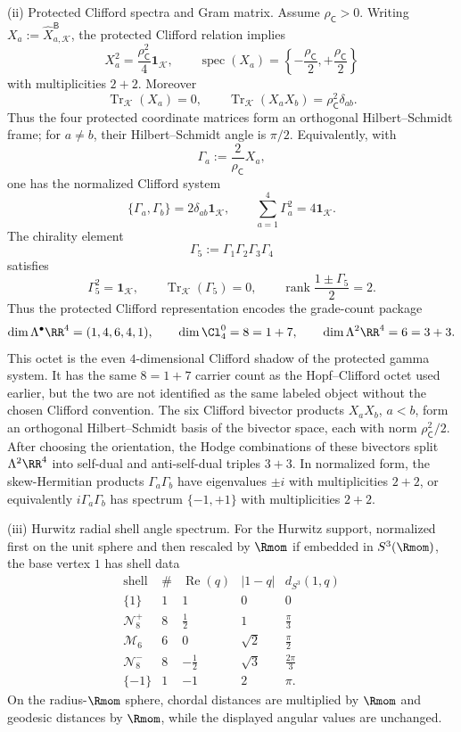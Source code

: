 \documentclass[11pt]{article}
\begin{document}
\begin{theorem}[\(m=1\) finite numerical data]
\smallskip
\noindent\textup{(ii) Protected Clifford spectra and Gram matrix.}
Assume \(\rho_{\mathsf C}>0\).  Writing
\(X_a:=\widehat X^{\mathsf B}_{a,\mathcal K}\), the protected Clifford relation
implies
\[
    X_a^2=\frac{\rho_{\mathsf C}^2}{4}\mathbf1_{\mathcal K},
    \qquad
    \operatorname{spec}(X_a)=
    \left\{-\frac{\rho_{\mathsf C}}{2},+\frac{\rho_{\mathsf C}}{2}\right\}
\]
with multiplicities \(2+2\).  Moreover
\[
    \operatorname{Tr}_{\mathcal K}(X_a)=0,
    \qquad
    \operatorname{Tr}_{\mathcal K}(X_aX_b)=\rho_{\mathsf C}^2\delta_{ab}.
\]
Thus the four protected coordinate matrices form an orthogonal Hilbert--Schmidt
frame; for \(a\ne b\), their Hilbert--Schmidt angle is \(\pi/2\).  Equivalently,
with
\[
    \Gamma_a:=\frac{2}{\rho_{\mathsf C}}X_a,
\]
one has the normalized Clifford system
\[
    \{\Gamma_a,\Gamma_b\}=2\delta_{ab}\mathbf1_{\mathcal K},
    \qquad
    \sum_{a=1}^4\Gamma_a^2=4\mathbf1_{\mathcal K}.
\]
The chirality element
\[
    \Gamma_5:=\Gamma_1\Gamma_2\Gamma_3\Gamma_4
\]
satisfies
\[
    \Gamma_5^2=\mathbf1_{\mathcal K},
    \qquad
    \operatorname{Tr}_{\mathcal K}(\Gamma_5)=0,
    \qquad
    \operatorname{rank}\frac{1\pm\Gamma_5}{2}=2.
\]
Thus the protected Clifford representation encodes the grade-count package
\[
    \dim\Lambda^\bullet\RR^4=(1,4,6,4,1),
    \qquad
    \dim\Cl^0_4=8=1+7,
    \qquad
    \dim\Lambda^2\RR^4=6=3+3.
\]
This octet is the even \(4\)-dimensional Clifford shadow of the protected gamma system.  It has the same \(8=1+7\) carrier count as the Hopf--Clifford octet used earlier, but the two are not identified as the same labeled object without the chosen Clifford convention.
The six Clifford bivector products \(X_aX_b\), \(a<b\), form an orthogonal Hilbert--Schmidt basis of the bivector space, each with norm \(\rho_{\mathsf C}^2/2\). After choosing the orientation, the Hodge combinations of these bivectors split \(\Lambda^2\RR^4\) into self-dual and anti-self-dual triples \(3+3\).  In normalized
form, the skew-Hermitian products \(\Gamma_a\Gamma_b\) have eigenvalues
\(\pm i\) with multiplicities \(2+2\), or equivalently
\(i\Gamma_a\Gamma_b\) has spectrum \(\{ -1,+1\}\) with multiplicities \(2+2\).

\smallskip
\noindent\textup{(iii) Hurwitz radial shell angle spectrum.}
For the Hurwitz support, normalized first on the unit sphere and then rescaled by
\(\Rmom\) if embedded in \(S^3(\Rmom)\), the base vertex \(1\) has shell data
\[
\begin{array}{c|c|c|c|c}
\text{shell} & \# & \operatorname{Re}(q) & |1-q| & d_{S^3}(1,q)\\
\hline
\{1\} & 1 & 1 & 0 & 0\\
\mathcal N_8^+ & 8 & \tfrac12 & 1 & \tfrac\pi3\\
\mathcal M_6 & 6 & 0 & \sqrt2 & \tfrac\pi2\\
\mathcal N_8^- & 8 & -\tfrac12 & \sqrt3 & \tfrac{2\pi}{3}\\
\{-1\} & 1 & -1 & 2 & \pi.
\end{array}
\]
On the radius-\(\Rmom\) sphere, chordal distances are multiplied by \(\Rmom\) and
geodesic distances by \(\Rmom\), while the displayed angular values are
unchanged.


\end{theorem}
\end{document}

